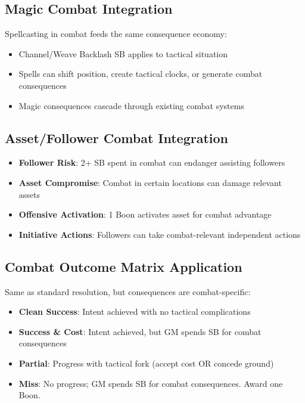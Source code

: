 \subsection{Magic Combat Integration}

Spellcasting in combat feeds the same consequence economy:

\begin{itemize}
    \item Channel/Weave Backlash SB applies to tactical situation
    \item Spells can shift position, create tactical clocks, or generate combat consequences
    \item Magic consequences cascade through existing combat systems
\end{itemize}

\subsection{Asset/Follower Combat Integration}

\begin{itemize}
    \item \textbf{Follower Risk}: 2+ SB spent in combat can endanger assisting followers
    \item \textbf{Asset Compromise}: Combat in certain locations can damage relevant assets  
    \item \textbf{Offensive Activation}: 1 Boon activates asset for combat advantage
    \item \textbf{Initiative Actions}: Followers can take combat-relevant independent actions
\end{itemize}

\subsection{Combat Outcome Matrix Application}

Same as standard resolution, but consequences are combat-specific:

\begin{itemize}
    \item \textbf{Clean Success}: Intent achieved with no tactical complications
    \item \textbf{Success \& Cost}: Intent achieved, but GM spends SB for combat consequences
    \item \textbf{Partial}: Progress with tactical fork (accept cost OR concede ground)
    \item \textbf{Miss}: No progress; GM spends SB for combat consequences. Award one Boon.
\end{itemize}

